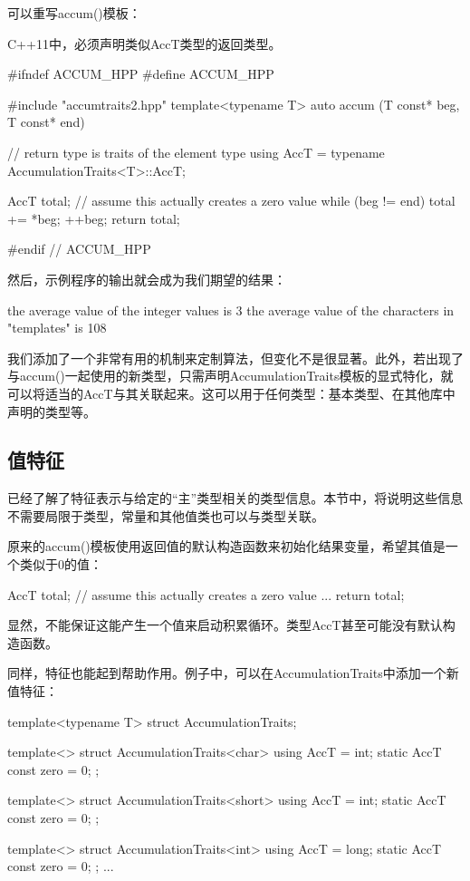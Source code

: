 可以重写accum()模板：

\begin{notice}
C++11中，必须声明类似AccT类型的返回类型。
\end{notice}

\begin{cpp}
#ifndef ACCUM_HPP
#define ACCUM_HPP

#include "accumtraits2.hpp"
template<typename T>
auto accum (T const* beg, T const* end)
{
	// return type is traits of the element type
	using AccT = typename AccumulationTraits<T>::AccT;
	
	AccT total{}; // assume this actually creates a zero value
	while (beg != end) {
		total += *beg;
		++beg;
	}
	return total;
}

#endif // ACCUM_HPP
\end{cpp}

然后，示例程序的输出就会成为我们期望的结果：

\begin{shell}
the average value of the integer values is 3
the average value of the characters in "templates" is 108
\end{shell}

我们添加了一个非常有用的机制来定制算法，但变化不是很显著。此外，若出现了与accum()一起使用的新类型，只需声明AccumulationTraits模板的显式特化，就可以将适当的AccT与其关联起来。这可以用于任何类型：基本类型、在其他库中声明的类型等。

\subsection{值特征}

已经了解了特征表示与给定的“主”类型相关的类型信息。本节中，将说明这些信息不需要局限于类型，常量和其他值类也可以与类型关联。

原来的accum()模板使用返回值的默认构造函数来初始化结果变量，希望其值是一个类似于0的值：

\begin{cpp}
AccT total{}; // assume this actually creates a zero value
...
return total;
\end{cpp}

显然，不能保证这能产生一个值来启动积累循环。类型AccT甚至可能没有默认构造函数。

同样，特征也能起到帮助作用。例子中，可以在AccumulationTraits中添加一个新值特征：

\begin{cpp}
template<typename T>
struct AccumulationTraits;

template<>
struct AccumulationTraits<char> {
	using AccT = int;
	static AccT const zero = 0;
};

template<>
struct AccumulationTraits<short> {
	using AccT = int;
	static AccT const zero = 0;
};

template<>
struct AccumulationTraits<int> {
	using AccT = long;
	static AccT const zero = 0;
};
...
\end{cpp}


